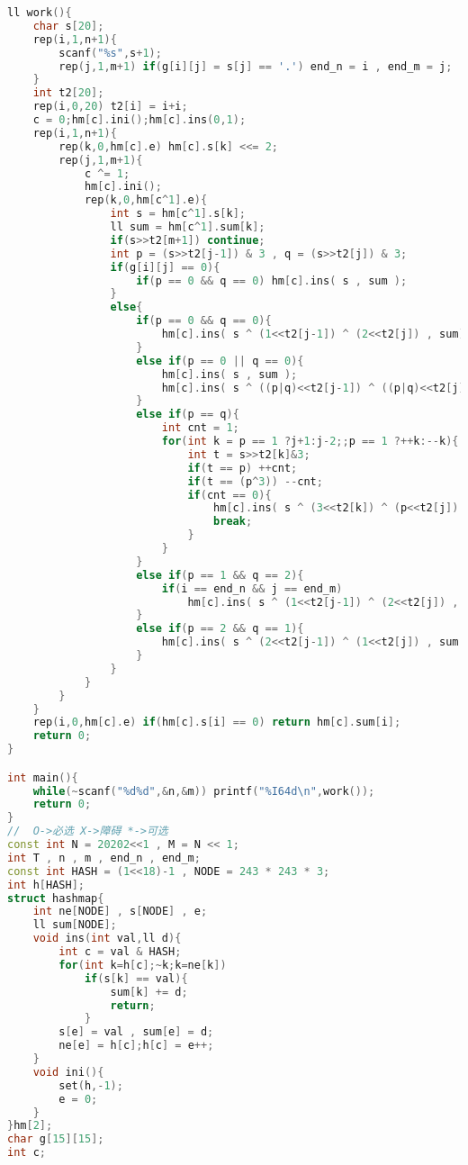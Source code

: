 \begin{lstlisting}[language=C++]
ll work(){
    char s[20];
    rep(i,1,n+1){
        scanf("%s",s+1);
        rep(j,1,m+1) if(g[i][j] = s[j] == '.') end_n = i , end_m = j;
    }
    int t2[20];
    rep(i,0,20) t2[i] = i+i;
    c = 0;hm[c].ini();hm[c].ins(0,1);
    rep(i,1,n+1){
        rep(k,0,hm[c].e) hm[c].s[k] <<= 2;
        rep(j,1,m+1){
            c ^= 1;
            hm[c].ini();
            rep(k,0,hm[c^1].e){
                int s = hm[c^1].s[k];
                ll sum = hm[c^1].sum[k];
                if(s>>t2[m+1]) continue;
                int p = (s>>t2[j-1]) & 3 , q = (s>>t2[j]) & 3;
                if(g[i][j] == 0){
                    if(p == 0 && q == 0) hm[c].ins( s , sum );
                }
                else{
                    if(p == 0 && q == 0){
                        hm[c].ins( s ^ (1<<t2[j-1]) ^ (2<<t2[j]) , sum);
                    }
                    else if(p == 0 || q == 0){
                        hm[c].ins( s , sum );
                        hm[c].ins( s ^ ((p|q)<<t2[j-1]) ^ ((p|q)<<t2[j]) , sum );
                    }
                    else if(p == q){
                        int cnt = 1;
                        for(int k = p == 1 ?j+1:j-2;;p == 1 ?++k:--k){
                            int t = s>>t2[k]&3;
                            if(t == p) ++cnt;
                            if(t == (p^3)) --cnt;
                            if(cnt == 0){
                                hm[c].ins( s ^ (3<<t2[k]) ^ (p<<t2[j]) ^ (p<<t2[j-1]) , sum );
                                break;
                            }
                        }
                    }
                    else if(p == 1 && q == 2){
                        if(i == end_n && j == end_m)
                            hm[c].ins( s ^ (1<<t2[j-1]) ^ (2<<t2[j]) , sum);
                    }
                    else if(p == 2 && q == 1){
                        hm[c].ins( s ^ (2<<t2[j-1]) ^ (1<<t2[j]) , sum );
                    }
                }
            }
        }
    }
    rep(i,0,hm[c].e) if(hm[c].s[i] == 0) return hm[c].sum[i];
    return 0;
}

int main(){
    while(~scanf("%d%d",&n,&m)) printf("%I64d\n",work());
    return 0;
}
//	O->必选 X->障碍 *->可选
const int N = 20202<<1 , M = N << 1;
int T , n , m , end_n , end_m;
const int HASH = (1<<18)-1 , NODE = 243 * 243 * 3;
int h[HASH];
struct hashmap{
    int ne[NODE] , s[NODE] , e;
    ll sum[NODE];
    void ins(int val,ll d){
        int c = val & HASH;
        for(int k=h[c];~k;k=ne[k])
            if(s[k] == val){
                sum[k] += d;
                return;
            }
        s[e] = val , sum[e] = d;
        ne[e] = h[c];h[c] = e++;
    }
    void ini(){
        set(h,-1);
        e = 0;
    }
}hm[2];
char g[15][15];
int c;


\end{lstlisting}
